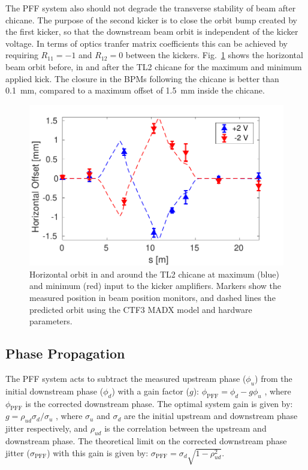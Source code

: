 \documentclass[%
 reprint,
 amsmath,amssymb,
 prl,
]{revtex4-1}
\begin{document}
The PFF system also should not degrade the transverse stability of beam after 
chicane. The purpose of the second kicker is to close the orbit bump created by 
the first kicker, so that the downstream beam orbit is independent of the 
kicker voltage. In terms of optics tranfer matrix coefficients this can be 
achieved by requiring \(R_{11}=-1\) and \(R_{12}=0\) between the 
kickers. Fig.~\ref{fig:orbClos} shows the horizontal beam orbit before, in and 
after the TL2 chicane for the maximum and minimum applied kick. The closure in 
the BPMs following the chicane is better than 0.1~mm, compared to a maximum 
offset of 1.5~mm inside the chicane.

\begin{figure}
	\includegraphics[width=\columnwidth]{figs/orbClos}
	\caption{\label{fig:orbClos}Horizontal orbit in and around the TL2 chicane 
	at maximum (blue) and 
	minimum (red) 
	input to the kicker amplifiers. Markers show the measured position in beam 
	position monitors, and dashed lines the predicted orbit using the 
	CTF3 MADX model and hardware parameters.}
\end{figure}


\subsection{\label{ss:r56} Phase Propagation}

The PFF system acts to subtract the measured upstream phase (\(\phi_u\)) from 
the initial downstream phase (\(\phi_d\)) with a gain factor (\(g\)):
\(\phi_{\mathrm{PFF}} = \phi_d - g\phi_u\)
, where \(\phi_{\mathrm{PFF}}\) is the corrected downstream phase. The optimal 
system gain is given by:
\(g = \rho_{ud} \sigma_d/\sigma_u\)
, where \(\sigma_u\) and \(\sigma_d\) are the initial upstream and downstream 
phase jitter respectively, and \(\rho_{ud}\) is the correlation between the 
upstream and downstream phase. The theoretical limit on the corrected 
downstream phase jitter (\(\sigma_{\mathrm{PFF}}\)) with this gain is given by:
\(\sigma_{\mathrm{PFF}}=\sigma_d \sqrt{1-\rho_{ud}^2}\). 
\end{document}
